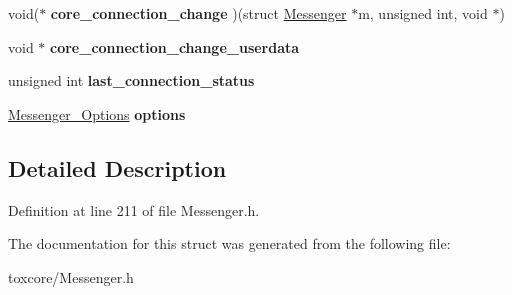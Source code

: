 \begin{DoxyCompactItemize}
\item 
\hypertarget{struct_messenger_a04d6d710a221e33282b2305ec4158ac4}{void($\ast$ {\bfseries core\+\_\+connection\+\_\+change} )(struct \hyperlink{struct_messenger}{Messenger} $\ast$m, unsigned int, void $\ast$)}\label{struct_messenger_a04d6d710a221e33282b2305ec4158ac4}

\item 
\hypertarget{struct_messenger_a55d1d5f05bdf28588035d0bffd52ac3a}{void $\ast$ {\bfseries core\+\_\+connection\+\_\+change\+\_\+userdata}}\label{struct_messenger_a55d1d5f05bdf28588035d0bffd52ac3a}

\item 
\hypertarget{struct_messenger_a97e16f5111643baf9c4f055af6b90e8c}{unsigned int {\bfseries last\+\_\+connection\+\_\+status}}\label{struct_messenger_a97e16f5111643baf9c4f055af6b90e8c}

\item 
\hypertarget{struct_messenger_a180dba994d1fff627e19da4179148669}{\hyperlink{struct_messenger___options}{Messenger\+\_\+\+Options} {\bfseries options}}\label{struct_messenger_a180dba994d1fff627e19da4179148669}

\end{DoxyCompactItemize}


\subsection{Detailed Description}


Definition at line 211 of file Messenger.\+h.



The documentation for this struct was generated from the following file\+:\begin{DoxyCompactItemize}
\item 
toxcore/Messenger.\+h\end{DoxyCompactItemize}
